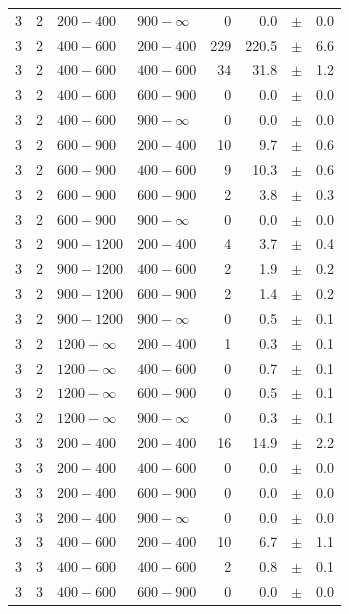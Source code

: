\begin{table}[!h]
\begin{tabular}{rrllrrcl}
3 & 2 & $ 200- 400$ & $900-\infty$ &      0 &      0.0 &$\pm$&    0.0 \\
3 & 2 & $ 400- 600$ & $200-400$ &    229 &    220.5 &$\pm$&    6.6 \\
3 & 2 & $ 400- 600$ & $400-600$ &     34 &     31.8 &$\pm$&    1.2 \\
3 & 2 & $ 400- 600$ & $600-900$ &      0 &      0.0 &$\pm$&    0.0 \\
3 & 2 & $ 400- 600$ & $900-\infty$ &      0 &      0.0 &$\pm$&    0.0 \\
3 & 2 & $ 600- 900$ & $200-400$ &     10 &      9.7 &$\pm$&    0.6 \\
3 & 2 & $ 600- 900$ & $400-600$ &      9 &     10.3 &$\pm$&    0.6 \\
3 & 2 & $ 600- 900$ & $600-900$ &      2 &      3.8 &$\pm$&    0.3 \\
3 & 2 & $ 600- 900$ & $900-\infty$ &      0 &      0.0 &$\pm$&    0.0 \\
3 & 2 & $ 900-1200$ & $200-400$ &      4 &      3.7 &$\pm$&    0.4 \\
3 & 2 & $ 900-1200$ & $400-600$ &      2 &      1.9 &$\pm$&    0.2 \\
3 & 2 & $ 900-1200$ & $600-900$ &      2 &      1.4 &$\pm$&    0.2 \\
3 & 2 & $ 900-1200$ & $900-\infty$ &      0 &      0.5 &$\pm$&    0.1 \\
3 & 2 & $1200- \infty$ & $200-400$ &      1 &      0.3 &$\pm$&    0.1 \\
3 & 2 & $1200- \infty$ & $400-600$ &      0 &      0.7 &$\pm$&    0.1 \\
3 & 2 & $1200- \infty$ & $600-900$ &      0 &      0.5 &$\pm$&    0.1 \\
3 & 2 & $1200- \infty$ & $900-\infty$ &      0 &      0.3 &$\pm$&    0.1 \\
3 & 3 & $ 200- 400$ & $200-400$ &     16 &     14.9 &$\pm$&    2.2 \\
3 & 3 & $ 200- 400$ & $400-600$ &      0 &      0.0 &$\pm$&    0.0 \\
3 & 3 & $ 200- 400$ & $600-900$ &      0 &      0.0 &$\pm$&    0.0 \\
3 & 3 & $ 200- 400$ & $900-\infty$ &      0 &      0.0 &$\pm$&    0.0 \\
3 & 3 & $ 400- 600$ & $200-400$ &     10 &      6.7 &$\pm$&    1.1 \\
3 & 3 & $ 400- 600$ & $400-600$ &      2 &      0.8 &$\pm$&    0.1 \\
3 & 3 & $ 400- 600$ & $600-900$ &      0 &      0.0 &$\pm$&    0.0 \\

\end{tabular}
\end{table}
